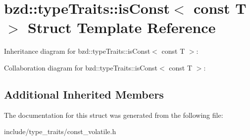 \hypertarget{structbzd_1_1typeTraits_1_1isConst_3_01const_01T_01_4}{}\section{bzd\+:\+:type\+Traits\+:\+:is\+Const$<$ const T $>$ Struct Template Reference}
\label{structbzd_1_1typeTraits_1_1isConst_3_01const_01T_01_4}


Inheritance diagram for bzd\+:\+:type\+Traits\+:\+:is\+Const$<$ const T $>$\+:


Collaboration diagram for bzd\+:\+:type\+Traits\+:\+:is\+Const$<$ const T $>$\+:
\subsection*{Additional Inherited Members}


The documentation for this struct was generated from the following file\+:\begin{DoxyCompactItemize}
\item 
include/type\+\_\+traits/const\+\_\+volatile.\+h\end{DoxyCompactItemize}
